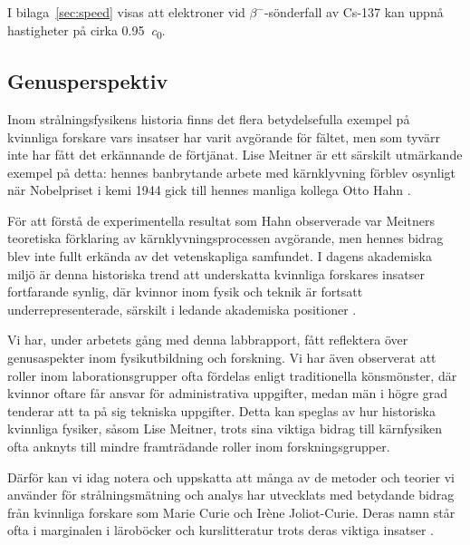 I bilaga~\ref{sec:speed} visas att elektroner vid $\beta^-$-sönderfall av
Cs-137 kan uppnå hastigheter på cirka \qty{0.95}{\clight}.

\subsection{Genusperspektiv}

Inom strålningsfysikens historia finns det flera betydelsefulla exempel på
kvinnliga forskare vars insatser har varit avgörande för fältet, men som tyvärr
inte har fått det erkännande de förtjänat. Lise Meitner är ett särskilt
utmärkande exempel på detta: hennes banbrytande arbete med kärnklyvning förblev
osynligt när Nobelpriset i kemi 1944 gick till hennes manliga kollega Otto Hahn
\parencite{discovery}.

För att förstå de experimentella resultat som Hahn observerade var Meitners
teoretiska förklaring av kärnklyvningsprocessen avgörande, men hennes bidrag
blev inte fullt erkända av det vetenskapliga samfundet. I dagens akademiska
miljö är denna historiska trend att underskatta kvinnliga forskares insatser
fortfarande synlig, där kvinnor inom fysik och teknik är fortsatt
underrepresenterade, särskilt i ledande akademiska positioner
\parencite{meitner}.

Vi har, under arbetets gång med denna labbrapport, fått reflektera över
genusaspekter inom fysikutbildning och forskning. Vi har även observerat att
roller inom laborationsgrupper ofta fördelas enligt traditionella könsmönster,
där kvinnor oftare får ansvar för administrativa uppgifter, medan män i högre
grad tenderar att ta på sig tekniska uppgifter. Detta kan speglas av hur
historiska kvinnliga fysiker, såsom Lise Meitner, trots sina viktiga bidrag
till kärnfysiken ofta anknyts till mindre framträdande roller inom
forskningsgrupper.

Därför kan vi idag notera och uppskatta att många av de metoder och teorier vi
använder för strålningsmätning och analys har utvecklats med betydande bidrag
från kvinnliga forskare som Marie Curie och Irène Joliot-Curie. Deras namn står
ofta i marginalen i läroböcker och kurslitteratur trots deras viktiga insatser
\parencite{women}.
